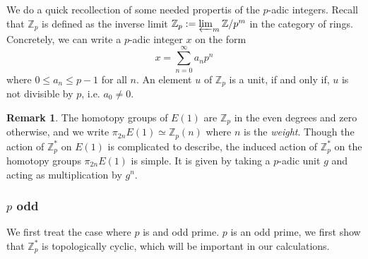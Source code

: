 \documentclass[a4paper]{article} %
\theoremstyle{definition}
\newtheorem{remark}[theorem]{Remark}
\newcommand{\Z}{\mathbb{Z}}
\begin{document}
We do a quick recollection of some needed propertis of the $p$-adic integers. Recall that $\Z_p$ is defined as the inverse limit $\Z_p := \varprojlim_m \Z/p^m$ in the category of rings. Concretely, we can write a $p$-adic integer $x$ on the form
\[
  x=\sum_{n = 0}^\infty a_n p^n
\]
where $ 0 \le a_n \le p-1$ for all $n$.
An element $u$ of $\Z_p$ is a unit, if and only if, $u$ is not divisible by $p$, i.e. $a_0 \neq 0$.

\begin{remark}
  The homotopy groups of $E(1)$ are $\Z_p$ in the even degrees and zero otherwise, and we write $\pi_{2n}E(1) \simeq \Z_p(n)$ where $n$ is the \textit{weight}. Though the action of $\Z_p^*$ on $E(1)$ is complicated to describe, the induced action of $\Z_p^*$ on the homotopy groups $\pi_{2n}E(1)$ is simple. It is given by taking a $p$-adic unit $g$ and acting as multiplication by $g^n$.
\end{remark}

\subsubsection{$p$ odd}

We first treat the case where $p$ is and odd prime. $p$ is an odd prime, we first show that $\Z_p^*$ is topologically cyclic, which will be important in our calculations.
\end{document}
